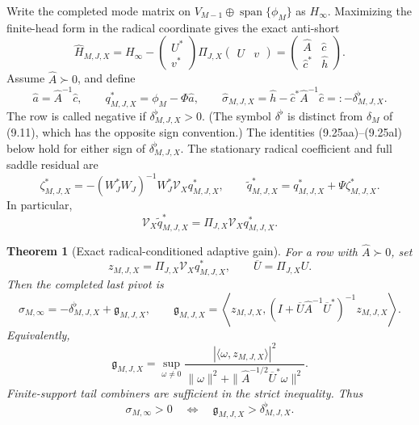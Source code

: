 \documentclass[11pt]{amsart}
\newtheorem{theorem}{Theorem}[section]
\theoremstyle{definition}
\theoremstyle{remark}
\begin{document}
Write the completed mode matrix on
\(V_{M-1}\oplus\operatorname{span}\{\phi_M\}\) as \(H_\infty\).
Maximizing the finite-head form in the radical coordinate gives the exact
anti-short
\[
 \boxed{
 \widehat H_{M,J,X}=H_\infty-
 \begin{pmatrix}U^*\\v^*\end{pmatrix}
 \Pi_{J,X}\begin{pmatrix}U&v\end{pmatrix}
 =\begin{pmatrix}\widehat A&\widehat c\\
                  \widehat c^*&\widehat h\end{pmatrix}.}
\tag{9.25w}
\]
Assume \(\widehat A\succ0\), and define
\[
 \widehat a=\widehat A^{-1}\widehat c,\qquad
 q_{M,J,X}^*=\phi_M-\Phi\widehat a,\qquad
 \widehat\sigma_{M,J,X}
 =\widehat h-\widehat c^*\widehat A^{-1}\widehat c
 =:-\delta^{\flat}_{M,J,X}.
\tag{9.25x}
\]
The row is called negative if \(\delta^{\flat}_{M,J,X}>0\).  (The
symbol \(\delta^\flat\) is distinct from \(\delta_M\) of (9.11), which
has the opposite sign convention.)  The identities (9.25aa)--(9.25al)
below hold for either sign of \(\delta^{\flat}_{M,J,X}\).
The stationary radical coefficient and full saddle residual are
\[
 \zeta_{M,J,X}^*=-(W_J^*W_J)^{-1}W_J^*\mathcal V_Xq_{M,J,X}^*,
 \qquad
 \widetilde q_{M,J,X}^*=q_{M,J,X}^*+\Psi\zeta_{M,J,X}^*.
\tag{9.25y}
\]
In particular,
\[
 \mathcal V_X\widetilde q_{M,J,X}^*
 =\Pi_{J,X}\mathcal V_Xq_{M,J,X}^*.
\tag{9.25z}
\]

\begin{theorem}[Exact radical-conditioned adaptive gain]
\label{thm:radical-conditioned-gain}
For a row with \(\widehat A\succ0\), set
\[
 z_{M,J,X}=\Pi_{J,X}\mathcal V_Xq_{M,J,X}^*,
 \qquad \overline U=\Pi_{J,X}U.
\]
Then the completed last pivot is
\[
 \boxed{
 \sigma_{M,\infty}=-\delta^{\flat}_{M,J,X}+\mathfrak g_{M,J,X},
 \qquad
 \mathfrak g_{M,J,X}
 =\left\langle z_{M,J,X},
 (I+\overline U\widehat A^{-1}\overline U^*)^{-1}
 z_{M,J,X}\right\rangle.}
\tag{9.25aa}
\]
Equivalently,
\[
 \boxed{
 \mathfrak g_{M,J,X}
 =\sup_{\omega\ne0}
 \frac{|\langle\omega,z_{M,J,X}\rangle|^2}
 {\|\omega\|^2+
  \|\widehat A^{-1/2}\overline U^*\omega\|^2}.}
\tag{9.25ab}
\]
Finite-support tail combiners are sufficient in the strict inequality.
Thus
\[
 \boxed{\sigma_{M,\infty}>0
 \quad\Longleftrightarrow\quad
 \mathfrak g_{M,J,X}>\delta^{\flat}_{M,J,X}.}
\tag{9.25ac}
\]
\end{theorem}
\end{document}
